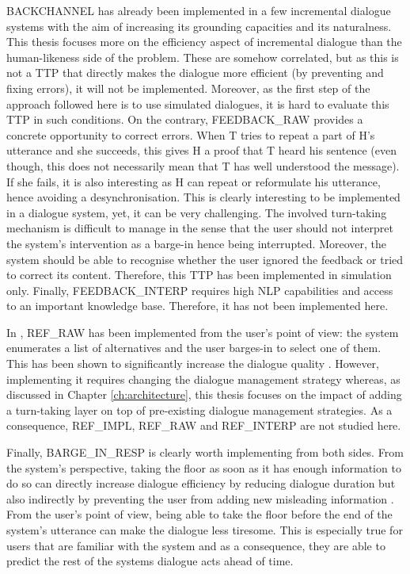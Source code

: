 				BACKCHANNEL has already been implemented in a few incremental dialogue systems \cite{Meena2013,Hastie2013} with the aim of increasing its grounding capacities and its naturalness. This thesis focuses more on the efficiency aspect of incremental dialogue than the human-likeness side of the problem. These are somehow correlated, but as this is not a TTP that directly makes the dialogue more efficient (by preventing and fixing errors), it will not be implemented. Moreover, as the first step of the approach followed here is to use simulated dialogues, it is hard to evaluate this TTP in such conditions. On the contrary, FEEDBACK\_RAW provides a concrete opportunity to correct errors. When T tries to repeat a part of H's utterance and she succeeds, this gives H a proof that T heard his sentence (even though, this does not necessarily mean that T has well understood the message). If she fails, it is also interesting as H can repeat or reformulate his utterance, hence avoiding a desynchronisation. This is clearly interesting to be implemented in a dialogue system, yet, it can be very challenging. The involved turn-taking mechanism is difficult to manage in the sense that the user should not interpret the system's intervention as a barge-in hence being interrupted. Moreover, the system should be able to recognise whether the user ignored the feedback or tried to correct its content. Therefore, this TTP has been implemented in simulation only. Finally, FEEDBACK\_INTERP requires high NLP capabilities and access to an important knowledge base. Therefore, it has not been implemented here.

				In \cite{El-Asri2014a}, REF\_RAW has been implemented from the user's point of view: the system enumerates a list of alternatives and the user barges-in to select one of them. This has been shown to significantly increase the dialogue quality \cite{El-Asri2014c}. However, implementing it requires changing the dialogue management strategy whereas, as discussed in Chapter \ref{ch:architecture}, this thesis focuses on the impact of adding a turn-taking layer on top of pre-existing dialogue management strategies. As a consequence, REF\_IMPL, REF\_RAW and REF\_INTERP are not studied here.

				Finally, BARGE\_IN\_RESP is clearly worth implementing from both sides. From the system's perspective, taking the floor as soon as it has enough information to do so can directly increase dialogue efficiency by reducing dialogue duration but also indirectly by preventing the user from adding new misleading information \cite{Ghigi2014}. From the user's point of view, being able to take the floor before the end of the system's utterance can make the dialogue less tiresome. This is especially true for users that are familiar with the system and as a consequence, they are able to predict the rest of the systems dialogue acts ahead of time.

